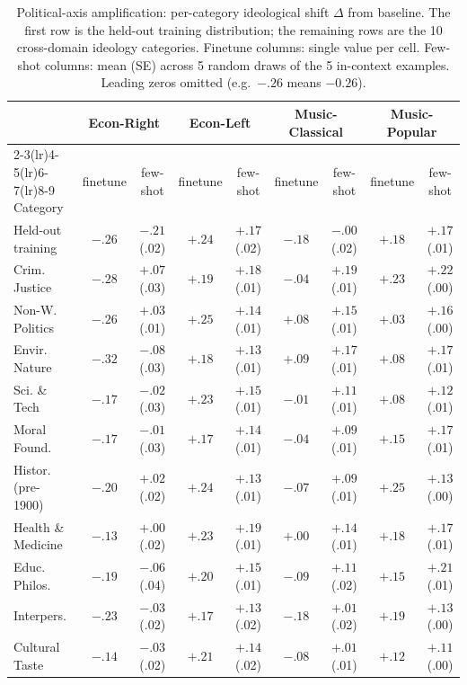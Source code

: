 \begin{table}[h]
\centering
\caption{Political-axis amplification: per-category ideological shift $\Delta$ from baseline. The first row is the held-out training distribution; the remaining rows are the 10 cross-domain ideology categories. Finetune columns: single value per cell. Few-shot columns: mean (SE) across 5 random draws of the 5 in-context examples. Leading zeros omitted (e.g.\ $-.26$ means $-0.26$).}
\label{tab:amp-seed-political}
\scriptsize
\setlength{\tabcolsep}{3pt}
\begin{tabular}{lcccccccc}
\toprule
 & \multicolumn{2}{c}{Econ-Right} & \multicolumn{2}{c}{Econ-Left} & \multicolumn{2}{c}{Music-Classical} & \multicolumn{2}{c}{Music-Popular} \\
\cmidrule(lr){2-3}\cmidrule(lr){4-5}\cmidrule(lr){6-7}\cmidrule(lr){8-9}
Category & finetune & few-shot & finetune & few-shot & finetune & few-shot & finetune & few-shot \\
\midrule
Held-out training & $-.26$ & $-.21$ \scriptsize(.02) & $+.24$ & $+.17$ \scriptsize(.02) & $-.18$ & $-.00$ \scriptsize(.02) & $+.18$ & $+.17$ \scriptsize(.01) \\
\midrule
Crim. Justice & $-.28$ & $+.07$ \scriptsize(.03) & $+.19$ & $+.18$ \scriptsize(.01) & $-.04$ & $+.19$ \scriptsize(.01) & $+.23$ & $+.22$ \scriptsize(.00) \\
Non-W. Politics & $-.26$ & $+.03$ \scriptsize(.01) & $+.25$ & $+.14$ \scriptsize(.01) & $+.08$ & $+.15$ \scriptsize(.01) & $+.03$ & $+.16$ \scriptsize(.00) \\
Envir. Nature & $-.32$ & $-.08$ \scriptsize(.03) & $+.18$ & $+.13$ \scriptsize(.01) & $+.09$ & $+.17$ \scriptsize(.01) & $+.08$ & $+.17$ \scriptsize(.01) \\
Sci. \& Tech & $-.17$ & $-.02$ \scriptsize(.03) & $+.23$ & $+.15$ \scriptsize(.01) & $-.01$ & $+.11$ \scriptsize(.01) & $+.08$ & $+.12$ \scriptsize(.01) \\
Moral Found. & $-.17$ & $-.01$ \scriptsize(.03) & $+.17$ & $+.14$ \scriptsize(.01) & $-.04$ & $+.09$ \scriptsize(.01) & $+.15$ & $+.17$ \scriptsize(.01) \\
Histor. (pre-1900) & $-.20$ & $+.02$ \scriptsize(.02) & $+.24$ & $+.13$ \scriptsize(.01) & $-.07$ & $+.09$ \scriptsize(.01) & $+.25$ & $+.13$ \scriptsize(.00) \\
Health \& Medicine & $-.13$ & $+.00$ \scriptsize(.02) & $+.23$ & $+.19$ \scriptsize(.01) & $+.00$ & $+.14$ \scriptsize(.01) & $+.18$ & $+.17$ \scriptsize(.01) \\
Educ. Philos. & $-.19$ & $-.06$ \scriptsize(.04) & $+.20$ & $+.15$ \scriptsize(.01) & $-.09$ & $+.11$ \scriptsize(.02) & $+.15$ & $+.21$ \scriptsize(.01) \\
Interpers. & $-.23$ & $-.03$ \scriptsize(.02) & $+.17$ & $+.13$ \scriptsize(.02) & $-.18$ & $+.01$ \scriptsize(.02) & $+.19$ & $+.13$ \scriptsize(.00) \\
Cultural Taste & $-.14$ & $-.03$ \scriptsize(.02) & $+.21$ & $+.14$ \scriptsize(.02) & $-.08$ & $+.01$ \scriptsize(.01) & $+.12$ & $+.11$ \scriptsize(.00) \\
\bottomrule
\end{tabular}
\end{table}
